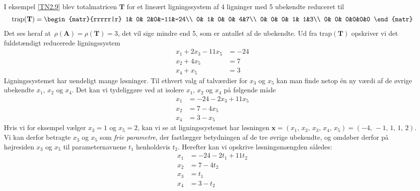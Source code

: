 \begin{example}\label{TN2.15}
I eksempel \ref{TN2.9} blev totalmatricen $\mathbf T$ for et lineært ligningssystem af 4 ligninger med 5 ubekendte reduceret til
\begin{equation}
\mathrm{trap}(\mathbf T)=
\begin{matr}{rrrrr|r}
 1& 0& 2&0&-11&-24\\
 0& 1& 0& 0& 4&7\\
 0& 0& 0& 1& 1&3\\
 0& 0& 0&0&0&0
\end{matr}
\end{equation}
Det ses heraf at $\,\rho(\mathbf A)=\rho(\mathbf T)= 3$, det vil sige mindre end 5, som er antallet af de ubekendte.\bs
Ud fra trap$(\mathbf T)$ opskriver vi det fuldstændigt reducerede ligningssystem
\begin{equation}\label{fuldstRed}
\begin{aligned}
x_1+2x_3-11x_5&=-24\\
x_2+4x_5&=7\\
x_4+x_5&=3
\end{aligned}
\end{equation}
Ligningssystemet har uendeligt mange løsninger. Til ethvert valg af talværdier for $x_3$ og $x_5$ kan man finde netop én ny værdi af de øvrige ubekendte $x_1$, $x_2$ og $x_4$. Det kan vi tydeliggøre ved at isolere $x_1$, $x_2$ og $x_4$ på følgende måde
\begin{equation}\label{isoleret}
\begin{aligned}
x_1&=-24-2x_3+11x_5\\
x_2&=7-4x_5\\
x_4&=3-x_5
\end{aligned}
\end{equation}
Hvis vi for eksempel vælger $x_3=1$ og $x_5=2$, kan vi se at ligningssystemet har løsningen $\mathbf x = (x_1,\,x_2,\,x_3,\,x_4,\,x_5)=(-4,\,-1,\,1,\,1,\,2)$. Vi kan derfor betragte $x_3$ og $x_5$ som \textit{frie parametre}, der fastlægger betydningen af de tre øvrige ubekendte, og omdøber derfor på højresiden $x_3$ og $x_5$ til parameternavnene $t_1$ henholdsvis $t_2$. Herefter kan vi opskrive løsningsmængden således:
\begin{equation}\label{isoleret2}
\begin{aligned}
x_1&=-24-2t_1+11t_2\\
x_2&=7-4t_2\\
x_3&=t_1\\
x_4&=3-t_2\\

\end{aligned}
\end{equation}
\end{example}
